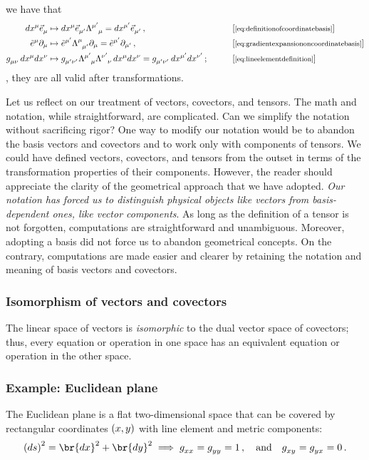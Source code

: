  we have that
%
\begin{align*}
  d\tvec\pos\mu\tbvec\mu &\mapsto d\tvec\pos\mu\tbvec{\aidx\mu}\ttransmat{\aidx\mu}{\mu} 
    = d\tvec\pos{\aidx\mu}\tbvec{\aidx\mu}\,, &&\qquad\eqtxt{\cref{eq:definitionofcoordinatebasis}} \\
  \tbcov\mu\ipd\mu &\mapsto\tbcov{\aidx\mu}\ttransmat{\mu}{\aidx\mu}\ipd\mu 
    = \tbcov{\aidx\mu}\ipd{\aidx\mu}\,, &&\qquad\eqtxt{\cref{eq:gradientexpansiononcoordinatebasis}} \\
  \tmetric\mu\nu\,d\tvec\pos\mu d\tvec\pos\nu
    &\mapsto\tmetric{\aidx\mu}{\aidx\nu}\ttransmat{\aidx\mu}{\mu}\ttransmat{\aidx\nu}{\nu}\,d\tvec\pos\mu d\tvec\pos\nu
  = \tmetric{\aidx\mu}{\aidx\nu}\,d\tvec\pos{\aidx\mu}d\tvec\pos{\aidx\nu}\,; &&\qquad\eqtxt{\cref{eq:lineelementdefinition}}
\end{align*}
%
\ie, they are all valid after transformations.

 Let us reflect on our treatment of vectors, covectors, and tensors. The math and notation, while straightforward, are complicated. Can we simplify the notation without sacrificing rigor? One way to modify our notation would be to abandon the basis vectors and covectors and to work only with components of tensors. We could have defined vectors, covectors, and tensors from the outset in terms of the transformation properties of their components. However, the reader should appreciate the clarity of the geometrical approach that we have adopted. \emph{Our notation has forced us to distinguish physical objects like vectors from basis-dependent ones, like vector components}. As long as the definition of a tensor is not forgotten, computations are straightforward and unambiguous. Moreover, adopting a basis did not force us to abandon geometrical concepts. On the contrary, computations are made easier and clearer by retaining the notation and meaning of basis vectors and covectors.


\subsubsection{Isomorphism of vectors and covectors}
%
 The linear space of vectors is \emph{isomorphic} to the dual vector space of covectors; thus, every equation or operation in one space has an equivalent equation or operation in the other space.


\subsubsection{Example: Euclidean plane}
%
 The Euclidean plane is a flat two-dimensional space that can be covered by rectangular coordinates $\tuple{\xpos,\ypos}$ with line element and metric components:
%
\begin{equation}\label{eq:euclideanplanelineelementmetricrectangular}
  \sqdifdist = \br{d\xpos}^2 + \br{d\ypos}^2 \implies
  \tmetric\xpos\xpos = \tmetric\ypos\ypos = 1\,,\quad\text{and}\quad
  \tmetric\xpos\ypos = \tmetric\ypos\xpos = 0\,.
\end{equation}


